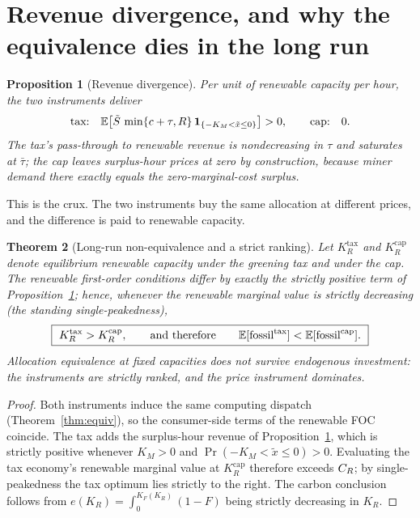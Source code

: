 \documentclass[11pt,reqno]{amsart}
\theoremstyle{plain}\newtheorem{theorem}{Theorem}\newtheorem{proposition}[theorem]{Proposition}
\theoremstyle{definition}\newtheorem{definition}[theorem]{Definition}
\theoremstyle{remark}\newtheorem{remark}[theorem]{Remark}
\newcommand{\KR}{K_R}\newcommand{\KF}{K_F}\newcommand{\KM}{K_M}
\begin{document}
\section{Revenue divergence, and why the equivalence dies in the long run}

\begin{proposition}[Revenue divergence]\label{prop:revenue}
Per unit of renewable capacity per hour, the two instruments deliver
\[
  \text{tax:}\quad \E\big[\tilde S\,\min\{c+\tau,R\}\,\mathbf 1_{\{-\KM<\tilde x\le 0\}}\big]>0,
  \qquad\text{cap:}\quad 0 .
\]
The tax's pass-through to renewable revenue is nondecreasing in $\tau$ and saturates at
$\bar\tau$; the cap leaves surplus-hour prices at zero by construction, because miner demand
there exactly equals the zero-marginal-cost surplus.
\end{proposition}

This is the crux. The two instruments buy the same allocation at different prices, and the
difference is paid to renewable capacity.

\begin{theorem}[Long-run non-equivalence and a strict ranking]\label{thm:longrun}
Let $\KR^{\mathrm{tax}}$ and $\KR^{\mathrm{cap}}$ denote equilibrium renewable capacity under
the greening tax and under the cap. The renewable first-order conditions differ by exactly
the strictly positive term of Proposition~\ref{prop:revenue}; hence, whenever the renewable
marginal value is strictly decreasing \textup{(}the standing single-peakedness\textup{)},
\[
  \boxed{\ \KR^{\mathrm{tax}}>\KR^{\mathrm{cap}},\qquad\text{and therefore}\qquad
  \E[\text{fossil}^{\mathrm{tax}}]<\E[\text{fossil}^{\mathrm{cap}}].\ }
\]
Allocation equivalence at fixed capacities does \emph{not} survive endogenous investment:
the instruments are strictly ranked, and the price instrument dominates.
\end{theorem}
\begin{proof}
Both instruments induce the same computing dispatch (Theorem~\ref{thm:equiv}), so the
consumer-side terms of the renewable FOC coincide. The tax adds the surplus-hour revenue of
Proposition~\ref{prop:revenue}, which is strictly positive whenever $\KM>0$ and
$\Pr(-\KM<\tilde x\le0)>0$. Evaluating the tax economy's renewable marginal value at
$\KR^{\mathrm{cap}}$ therefore exceeds $C_R$; by single-peakedness the tax optimum lies
strictly to the right. The carbon conclusion follows from
$e(\KR)=\int_0^{\KF(\KR)}(1-F)$ being strictly decreasing in $\KR$.
\end{proof}
\end{document}
